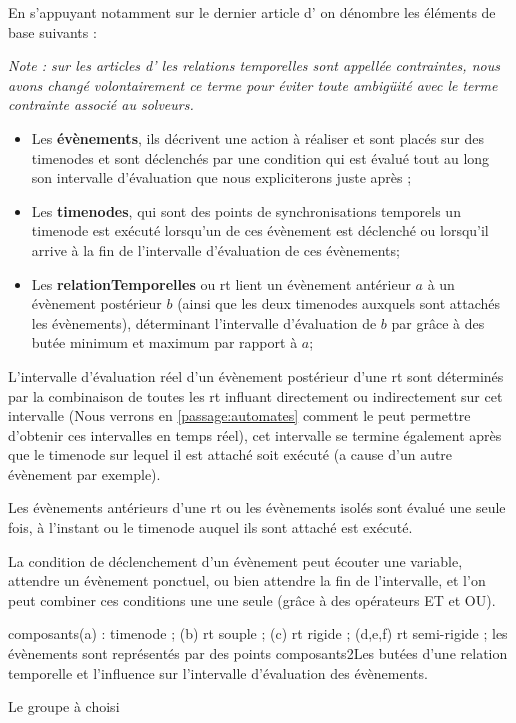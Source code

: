 En s'appuyant notamment sur le dernier article d'\ossia{}\cite{ossia2015interface} on dénombre les éléments de base suivants :

\emph{Note : sur les articles d'\ossia{} les relations temporelles sont appellée contraintes, nous avons changé volontairement ce terme pour éviter toute ambigüité avec le terme contrainte associé au solveurs.}

\begin{itemize}

    \item Les \textbf{évènements}, ils décrivent une action à réaliser et sont placés sur des \glspl{timenode} et sont déclenchés par une condition qui est évalué tout au long son intervalle d'évaluation que nous expliciterons juste après ;
    
    \item Les \textbf{\glspl{timenode}}, qui sont des points de synchronisations temporels un \gls{timenode} est exécuté lorsqu'un de ces évènement est déclenché ou lorsqu'il arrive à la fin de l'intervalle d'évaluation de ces évènements;

    \item Les \textbf{\glspl{relationTemporelle}} ou \acrshort{rt} lient un évènement antérieur $a$ à un évènement postérieur $b$ (ainsi que les deux timenodes auxquels sont attachés les évènements), déterminant l'intervalle d'évaluation de $b$ par grâce à des butée minimum et maximum par rapport à $a$;

\end{itemize}

L'intervalle d'évaluation réel d'un évènement postérieur d'une \acrshort{rt} sont déterminés par la combinaison de toutes les \acrshort{rt} influant directement ou indirectement sur cet intervalle (Nous verrons en \autoref{passage:automates} comment le \csp{} peut permettre d'obtenir ces intervalles en temps réel), cet intervalle se termine également après que le \gls{timenode} sur lequel il est attaché soit exécuté (a cause d'un autre évènement par exemple).

Les évènements antérieurs d'une \acrshort{rt} ou les évènements isolés sont évalué une seule fois, à l'instant ou le \gls{timenode} auquel ils sont attaché est exécuté.

\begin{apparte}
La condition de déclenchement d'un évènement peut écouter une variable, attendre un évènement ponctuel, ou bien attendre la fin de l'intervalle, et l'on peut combiner ces conditions une une seule (grâce à des opérateurs ET et OU).
\end{apparte}

%
{composants}{\textcolor{colorPri}{(a)} : \gls{timenode} ; %
                    \textcolor{colorPri}{(b)} \acrshort{rt} souple ; %
                    \textcolor{colorPri}{(c)} \acrshort{rt} rigide ; %
                    \textcolor{colorPri}{(d,e,f)} \acrshort{rt} semi-rigide ; %
                    les évènements sont représentés par des points%
                    }%
{composants2}{Les butées d'une relation temporelle et l'influence sur l'intervalle d'évaluation des évènements.}

Le groupe \ossia{} à choisi 